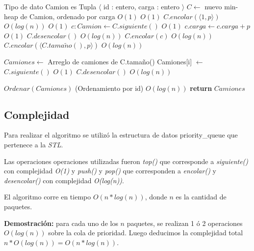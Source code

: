 \documentclass[a4paper, 10pt, twoside]{article}
\newenvironment{pseudo}[1][]{%
    \vspace{0.5em}%
    \begin{algorithmic}%
}
{%
    \end{algorithmic}%
    \vspace{0.5em}%
}
\newcommand{\In}{\textbf{in} }
\newcommand{\Ode}[1]{\hfill $O(#1)$}
\begin{document}
\begin{pseudo}
	\State Tipo de dato Camion es Tupla $\langle$ id : entero, carga : entero  $\rangle$
        \State $C \leftarrow$ nuevo min-heap de Camion, ordenado por carga   \Ode{1}
        \ForAll{$p$ \In $\langle p_1, \ldots, p_n \rangle$}    	
                                     \Ode{1}
                \State $C.encolar(\langle 1 , p \rangle)$       \Ode{log(n)}
                              \Ode{1}
                \State $c : Camion \leftarrow C.siguiente()$   \Ode{1}
                \State $c.carga \leftarrow c.carga + p$			\Ode{1}
                \State $C.desencolar()$                         \Ode{log(n)}
                \State $C.encolar(c)$                           \Ode{log(n)}
            \Else
                \State $C.encolar(\langle C.tama\tilde{n}o(), p \rangle)$ \Ode{log(n)}
            \EndIf
        \EndFor

  		\State $Camiones \leftarrow$ Arreglo de camiones de C.tamaño()
        \ForAll{$i$ \In $\langle 1, \ldots,$ C.tamaño() $\rangle$}			
      		\State Camiones[i] $\leftarrow$ $C.siguiente()$		\Ode{1}
      		\State $C.desencolar()$								\Ode{log(n)}
        \EndFor
        
        \State $Ordenar(Camiones)$ (Ordenamiento por id)		\Ode{log(n)}
        \State \textbf{return} $Camiones$
    \EndProcedure
\end{pseudo}


\subsection{Complejidad}

Para realizar el algoritmo se utilizó la estructura de datos priority\_queue que pertenece a la \textit{STL}.

Las operaciones operaciones utilizadas fueron \textit{top()} que corresponde a \textit{siguiente()} con complejidad \textit{O(1)} y \textit{push()} y \textit{pop()} que corresponden a \textit{encolar()} y \textit{desencolar()} con complejidad \textit{O(log(n))}.

El algoritmo corre en tiempo $O(n*log(n))$, donde $n$ es la cantidad de paquetes.

\textbf{Demostración:} para cada uno de los $n$ paquetes, se realizan 1 ó 2 operaciones $O(log(n))$ sobre la cola de prioridad. Luego deducimos la complejidad total $n * O(log(n)) = O(n * log(n))$.
\end{document}
